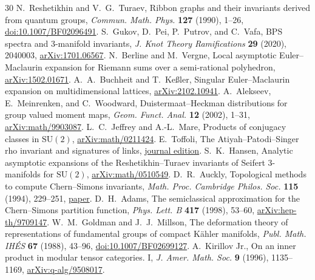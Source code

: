 \begin{thebibliography}{30}
 N.~Reshetikhin and V.~G.~Turaev, Ribbon graphs and their invariants derived from quantum groups, \emph{Commun. Math. Phys.} \textbf{127} (1990), 1--26, \href{https://doi.org/10.1007/BF02096491}{doi:10.1007/BF02096491}.
 S.~Gukov, D.~Pei, P.~Putrov, and C.~Vafa, BPS spectra and 3-manifold invariants, \emph{J. Knot Theory Ramifications} \textbf{29} (2020), 2040003, \href{https://arxiv.org/abs/1701.06567}{arXiv:1701.06567}.
 N.~Berline and M.~Vergne, Local asymptotic Euler--Maclaurin expansion for Riemann sums over a semi-rational polyhedron, \href{https://arxiv.org/abs/1502.01671}{arXiv:1502.01671}.
 A.~A.~Buchheit and T.~Ke{\ss}ler, Singular Euler--Maclaurin expansion on multidimensional lattices, \href{https://arxiv.org/abs/2102.10941}{arXiv:2102.10941}.
 A.~Alekseev, E.~Meinrenken, and C.~Woodward, Duistermaat--Heckman distributions for group valued moment maps, \emph{Geom. Funct. Anal.} \textbf{12} (2002), 1--31, \href{https://arxiv.org/abs/math/9903087}{arXiv:math/9903087}.
 L.~C.~Jeffrey and A.-L.~Mare, Products of conjugacy classes in \(\mathrm{SU}(2)\), \href{https://arxiv.org/abs/math/0211424}{arXiv:math/0211424}.
 E.~Toffoli, The Atiyah--Patodi--Singer rho invariant and signatures of links, \href{https://www.cambridge.org/core/journals/proceedings-of-the-edinburgh-mathematical-society/article/atiyahpatodisinger-rho-invariant-and-signatures-of-links/4BC45AB3FD65076115A82564AAAB23E0}{journal edition}.
 S.~K.~Hansen, Analytic asymptotic expansions of the Reshetikhin--Turaev invariants of Seifert 3-manifolds for \(\mathrm{SU}(2)\), \href{https://arxiv.org/abs/math/0510549}{arXiv:math/0510549}.
 D.~R.~Auckly, Topological methods to compute Chern--Simons invariants, \emph{Math. Proc. Cambridge Philos. Soc.} \textbf{115} (1994), 229--251, \href{https://www.math.ksu.edu/about/personal/dav/topmethCS.pdf}{paper}.
 D.~H.~Adams, The semiclassical approximation for the Chern--Simons partition function, \emph{Phys. Lett. B} \textbf{417} (1998), 53--60, \href{https://arxiv.org/abs/hep-th/9709147}{arXiv:hep-th/9709147}.
 W.~M.~Goldman and J.~J.~Millson, The deformation theory of representations of fundamental groups of compact K\"ahler manifolds, \emph{Publ. Math. IH\'ES} \textbf{67} (1988), 43--96, \href{https://doi.org/10.1007/BF02699127}{doi:10.1007/BF02699127}.
 A.~Kirillov Jr., On an inner product in modular tensor categories. I, \emph{J. Amer. Math. Soc.} \textbf{9} (1996), 1135--1169, \href{https://arxiv.org/abs/q-alg/9508017}{arXiv:q-alg/9508017}.

\end{thebibliography}
